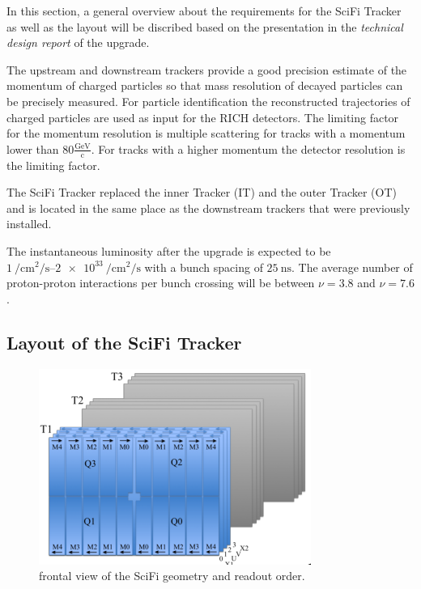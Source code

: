 In this section, a general overview about the requirements for the SciFi Tracker as well as the layout will be discribed based on the presentation in the \textit{technical design report}\cite{scifiInfo} of the upgrade.

The upstream and downstream trackers provide a good precision estimate of the momentum of charged particles so that mass resolution of decayed particles can be precisely measured.
For particle identification the reconstructed trajectories of charged particles are used as input for the RICH detectors.
The limiting factor for the momentum resolution is multiple scattering for tracks with a momentum lower than $\num{80}\frac{\text{GeV}}{\text{c}}$. For tracks with a higher momentum the detector resolution is the limiting factor.

The SciFi Tracker replaced the inner Tracker (IT) and the outer Tracker (OT)
and is located in the same place as the downstream trackers that were previously installed.

The instantaneous luminosity after the upgrade is expected to be $\SIrange{1}{2e33}{\per\centi\metre\squared\per\second}$ with a bunch spacing of $\SI{25}{\nano\second}$.
The average number of proton-proton interactions per bunch crossing will be between
$\nu = 3.8$ and $\nu = 7.6$.

\subsection{Layout of the SciFi Tracker}

\begin{figure}
  \centering
  \includegraphics{plots/SciFi_Tracker.png}
  \caption{frontal view of the SciFi geometry and readout order\cite{scifiupdate20210311}.}
  \label{fig:scifi}
\end{figure}

